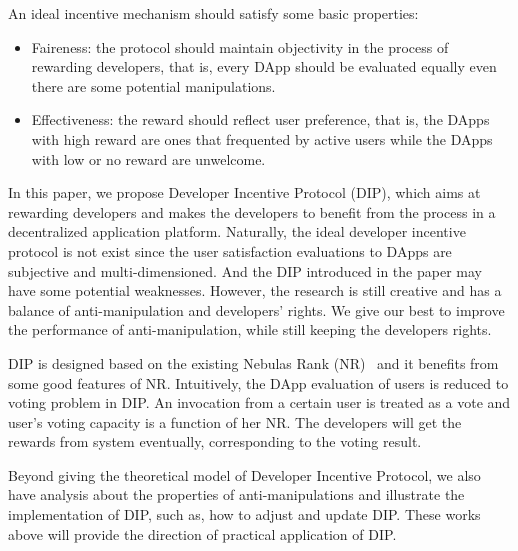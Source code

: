 An ideal incentive mechanism should satisfy some basic properties:
\begin{itemize}
\item Faireness: the protocol should maintain objectivity in the process of rewarding developers, that is, every DApp should be evaluated equally even there are some potential manipulations.
\item Effectiveness: the reward should reflect user preference, that is, the DApps with high reward are ones that frequented by active users while the DApps with low or no reward are unwelcome.
\end{itemize}

In this paper, we propose Developer Incentive Protocol (DIP), which aims at rewarding developers and makes the developers to benefit from the process in a decentralized application platform. Naturally, the ideal developer incentive protocol is not exist since the user satisfaction evaluations to DApps are subjective and multi-dimensioned. And the DIP introduced in the paper may have some potential weaknesses. However, the research is still creative and has a balance of anti-manipulation and developers' rights. We give our best to improve the performance of anti-manipulation, while still keeping the developers rights.

DIP is designed based on the existing Nebulas Rank (NR)~\cite{Nebulasyellowpaper} and it benefits from some good features of NR. Intuitively, the DApp evaluation of users is reduced to voting problem in DIP. An invocation from a certain user is treated as a vote and user's voting capacity is a function of her NR. The developers will get the rewards from system eventually, corresponding to the voting result.

Beyond giving the theoretical model of Developer Incentive Protocol, we also have analysis about the properties of anti-manipulations and illustrate the implementation of DIP, such as, how to adjust and update DIP. These works above will provide the direction of practical application of DIP.

